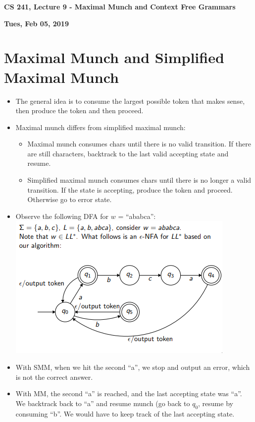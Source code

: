 \documentclass[12pt]{article}
\author{Clement Tsang}
\begin{document}
\begin{center}
\Large\textbf{CS 241, Lecture 9 - Maximal Munch and Context Free Grammars}
\end{center}
\begin{center}
\textbf{Tues, Feb 05, 2019}
\end{center}

\section{Maximal Munch and Simplified Maximal Munch}
\begin{itemize}
    \item The general idea is to consume the largest possible token that makes sense, then produce the token and then proceed.
    \item Maximal munch differs from simplified maximal munch:
        \begin{itemize}
            \item Maximal munch consumes chars until there is no valid transition.  If there are still characters, backtrack to the last valid accepting state and resume.
            \item Simplified maximal munch consumes chars until there is no longer a valid transition.  If the state is accepting, produce the token and proceed.  Otherwise go to error state.
        \end{itemize}
    \item Observe the following DFA for $w$ = ``ababca'':\\
        \includegraphics[scale=0.8]{maxmunch1.png} 
    \item With SMM, when we hit the second ``a'', we stop and output an error, which is not the correct answer.
    \item With MM, the second ``a'' is reached, and the last accepting state was ``a''.  We backtrack back to ``a'' and resume munch (go back to $q_0$, resume by consuming ``b''.  We would have to keep track of the last accepting state.

\end{itemize}
\end{document}
